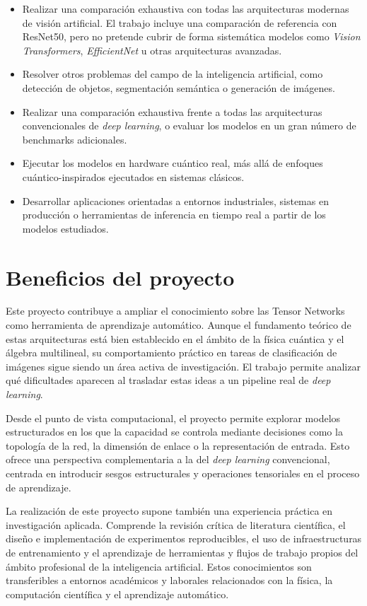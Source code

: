 \begin{itemize}

    \item Realizar una comparación exhaustiva con todas las arquitecturas modernas de visión artificial. El trabajo incluye una comparación de referencia con ResNet50, pero no pretende cubrir de forma sistemática modelos como \textit{Vision Transformers}, \textit{EfficientNet} u otras arquitecturas avanzadas.

	\item Resolver otros problemas del campo de la inteligencia artificial, como detección de objetos, segmentación semántica o generación de imágenes.

	\item Realizar una comparación exhaustiva frente a todas las arquitecturas convencionales de \textit{deep learning}, o evaluar los modelos en un gran número de benchmarks adicionales.

	\item Ejecutar los modelos en hardware cuántico real, más allá de enfoques cuántico-inspirados ejecutados en sistemas clásicos.

	\item Desarrollar aplicaciones orientadas a entornos industriales, sistemas en producción o herramientas de inferencia en tiempo real a partir de los modelos estudiados.
	
\end{itemize}

\section{Beneficios del proyecto}

Este proyecto contribuye a ampliar el conocimiento sobre las Tensor Networks como herramienta de aprendizaje automático. Aunque el fundamento teórico de estas arquitecturas está bien establecido en el ámbito de la física cuántica y el álgebra multilineal, su comportamiento práctico en tareas de clasificación de imágenes sigue siendo un área activa de investigación. El trabajo permite analizar qué dificultades aparecen al trasladar estas ideas a un pipeline real de \textit{deep learning}.

Desde el punto de vista computacional, el proyecto permite explorar modelos estructurados en los que la capacidad se controla mediante decisiones como la topología de la red, la dimensión de enlace o la representación de entrada. Esto ofrece una perspectiva complementaria a la del \textit{deep learning} convencional, centrada en introducir sesgos estructurales y operaciones tensoriales en el proceso de aprendizaje.

La realización de este proyecto supone también una experiencia práctica en investigación aplicada. Comprende la revisión crítica de literatura científica, el diseño e implementación de experimentos reproducibles, el uso de infraestructuras de entrenamiento y el aprendizaje de herramientas y flujos de trabajo propios del ámbito profesional de la inteligencia artificial. Estos conocimientos son transferibles a entornos académicos y laborales relacionados con la física, la computación científica y el aprendizaje automático.
